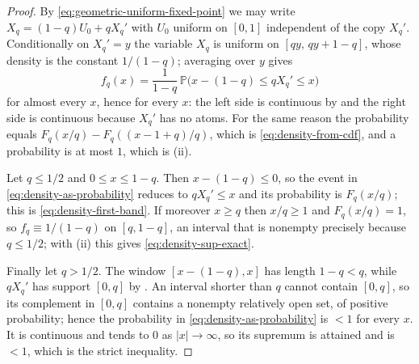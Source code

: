 \documentclass[11pt,oneside,openany]{book}
\theoremstyle{definition}
\theoremstyle{remark}
\newcommand{\abs}[1]{\lvert #1\rvert}
\begin{document}
\begin{proof}
By \eqref{eq:geometric-uniform-fixed-point} we may write $X_q=(1-q)U_0+qX_q'$ with $U_0$
uniform on $[0,1]$ independent of the copy $X_q'$.  Conditionally on $X_q'=y$ the variable
$X_q$ is uniform on $[qy,\,qy+1-q]$, whose density is the constant $1/(1-q)$; averaging
over $y$ gives
\begin{equation}\label{eq:density-as-probability}
 f_q(x)=\frac1{1-q}\,\mathbb P\bigl(x-(1-q)\le qX_q'\le x\bigr)
\end{equation}
for almost every $x$, hence for every $x$: the left side is continuous by
 and the right side is continuous because
$X_q'$ has no atoms.  For the same reason the probability equals
$F_q(x/q)-F_q((x-1+q)/q)$, which is \eqref{eq:density-from-cdf}, and a probability is at
most $1$, which is (ii).

Let $q\le1/2$ and $0\le x\le1-q$.  Then $x-(1-q)\le0$, so the event in
\eqref{eq:density-as-probability} reduces to $qX_q'\le x$ and its probability is
$F_q(x/q)$; this is \eqref{eq:density-first-band}.  If moreover $x\ge q$ then $x/q\ge1$
and $F_q(x/q)=1$, so $f_q\equiv1/(1-q)$ on $[q,1-q]$, an interval that is nonempty
precisely because $q\le1/2$; with (ii) this gives \eqref{eq:density-sup-exact}.

Finally let $q>1/2$.  The window $[x-(1-q),x]$ has length $1-q<q$, while $qX_q'$ has
support $[0,q]$ by .  An interval shorter than $q$
cannot contain $[0,q]$, so its complement in $[0,q]$ contains a nonempty relatively open
set, of positive probability; hence the probability in
\eqref{eq:density-as-probability} is $<1$ for every $x$.  It is continuous and tends to
$0$ as $\abs x\to\infty$, so its supremum is attained and is $<1$, which is the strict
inequality.
\end{proof}
\end{document}
